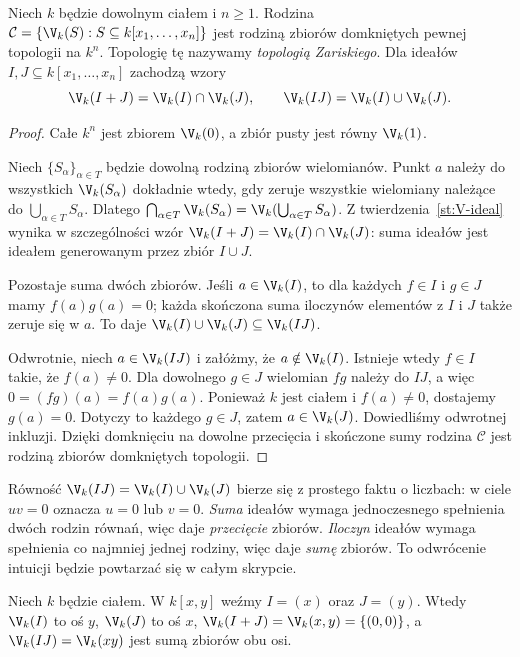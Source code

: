 \begin{twierdzenie}
\label{tw:zariski-top}
Niech $k$ będzie dowolnym ciałem i $n\ge1$.
Rodzina $\mathcal C=\{\V_k(S):S\subseteq k[x_1,\dots,x_n]\}$
jest rodziną zbiorów domkniętych pewnej topologii na $k^n$.
Topologię tę nazywamy \emph{topologią Zariskiego}.
Dla ideałów $I,J\subseteq k[x_1,\dots,x_n]$ zachodzą wzory
\[
\V_k(I+J)=\V_k(I)\cap\V_k(J),\qquad
\V_k(IJ)=\V_k(I)\cup\V_k(J).
\]
\end{twierdzenie}
\begin{proof}
Całe $k^n$ jest zbiorem $\V_k(0)$, a zbiór pusty jest równy
$\V_k(1)$.

Niech $\{S_\alpha\}_{\alpha\in T}$ będzie dowolną rodziną zbiorów
wielomianów. Punkt $a$ należy do wszystkich $\V_k(S_\alpha)$
dokładnie wtedy, gdy zeruje wszystkie wielomiany należące do
$\bigcup_{\alpha\in T}S_\alpha$. Dlatego
$\bigcap_{\alpha\in T}\V_k(S_\alpha)=
\V_k(\bigcup_{\alpha\in T}S_\alpha)$.
Z twierdzenia~\ref{st:V-ideal} wynika w szczególności wzór
$\V_k(I+J)=\V_k(I)\cap\V_k(J)$: suma ideałów jest ideałem
generowanym przez zbiór $I\cup J$.

Pozostaje suma dwóch zbiorów. Jeśli $a\in\V_k(I)$, to dla
każdych $f\in I$ i $g\in J$ mamy $f(a)g(a)=0$; każda
skończona suma iloczynów elementów z $I$ i $J$ także zeruje się w $a$.
To daje $\V_k(I)\cup\V_k(J)\subseteq\V_k(IJ)$.

Odwrotnie, niech $a\in\V_k(IJ)$ i załóżmy, że
$a\notin\V_k(I)$. Istnieje wtedy $f\in I$ takie, że
$f(a)\ne0$. Dla dowolnego $g\in J$ wielomian $fg$ należy do
$IJ$, a więc $0=(fg)(a)=f(a)g(a)$. Ponieważ $k$ jest ciałem
i $f(a)\ne0$, dostajemy $g(a)=0$. Dotyczy to każdego $g\in J$,
zatem $a\in\V_k(J)$. Dowiedliśmy odwrotnej inkluzji.
Dzięki domknięciu na dowolne przecięcia i skończone sumy
rodzina $\mathcal C$ jest rodziną zbiorów domkniętych topologii.
\end{proof}

\begin{uwaga}
Równość $\V_k(IJ)=\V_k(I)\cup\V_k(J)$ bierze się z prostego
faktu o liczbach: w ciele $uv=0$ oznacza $u=0$ lub $v=0$.
\emph{Suma} ideałów wymaga jednoczesnego spełnienia dwóch rodzin
równań, więc daje \emph{przecięcie} zbiorów. \emph{Iloczyn} ideałów
wymaga spełnienia co najmniej jednej rodziny, więc daje \emph{sumę}
zbiorów. To odwrócenie intuicji będzie powtarzać się w całym skrypcie.
\end{uwaga}

\begin{przyklad}
Niech $k$ będzie ciałem. W $k[x,y]$ weźmy
$I=(x)$ oraz $J=(y)$.
Wtedy $\V_k(I)$ to oś $y$, $\V_k(J)$ to oś $x$,
$\V_k(I+J)=\V_k(x,y)=\{(0,0)\}$, a
$\V_k(IJ)=\V_k(xy)$ jest sumą zbiorów obu osi.
\end{przyklad}

